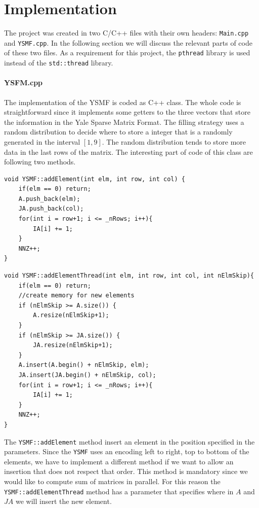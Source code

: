 \documentclass[]{article}
\begin{document}
\section{Implementation}
The project was created in two C/C++ files with their own headers: \texttt{Main.cpp} and \texttt{YSMF.cpp}.
In the following section we will discuss the relevant parts of  code of these two files.
As a requirement for this project, the \texttt{pthread} library is used instead of the \texttt{std::thread} library.
\paragraph{YSFM.cpp}
The implementation of the YSMF is coded as C++ class. The whole code is straightforward since it implements some getters to the three vectors that store the information in the Yale Sparse Matrix Format.
The filling strategy uses a random distribution to decide where to store a integer that is a randomly generated in the interval $[1,9]$. The random distribution tends to store more data in the last rows of the matrix.
The interesting part of code of this class are following two methods.

\label{addElement}
\begin{lstlisting}[style=customc]
void YSMF::addElement(int elm, int row, int col) {
    if(elm == 0) return;
    A.push_back(elm);
    JA.push_back(col);
    for(int i = row+1; i <= _nRows; i++){
        IA[i] += 1;
    }
    NNZ++;
}
\end{lstlisting}
\label{addElementThread}
\begin{lstlisting}[style=customc]
void YSMF::addElementThread(int elm, int row, int col, int nElmSkip){
    if(elm == 0) return;
    //create memory for new elements
    if (nElmSkip >= A.size()) {
        A.resize(nElmSkip+1);
    }
    if (nElmSkip >= JA.size()) {
        JA.resize(nElmSkip+1);
    }
    A.insert(A.begin() + nElmSkip, elm);
    JA.insert(JA.begin() + nElmSkip, col);
    for(int i = row+1; i <= _nRows; i++){
        IA[i] += 1;
    }
    NNZ++;
}
\end{lstlisting}
The \texttt{YSMF::addElement} method insert an element in the position specified in the parameters.
Since the \texttt{YSMF} uses an encoding left to right, top to bottom of the elements, we have to implement a different method if we want to allow an insertion that does not respect that order.
This method is mandatory since we would like to compute sum of matrices in parallel.
For this reason the \texttt{YSMF::addElementThread} method has a parameter that specifies where in $A$ and $JA$ we will insert the new element.
\end{document}
